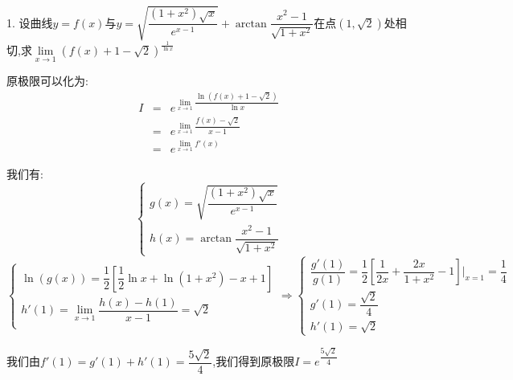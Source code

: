 1. 设曲线$y=f(x)$与$y=\sqrt{\dfrac{(1+x^2)\sqrt{x}}{e^{x-1}}}+\arctan\dfrac{x^2-1}{\sqrt{1+x^2}}$在点$(1,\sqrt{2})$处相切,求$\lim\limits_{x\rightarrow1}(f(x)+1-\sqrt{2})^{\frac{1}{\ln x}}$
\begin{solution}

	原极限可以化为:  
	\begin{eqnarray*}
		I&=&e^{\lim\limits_{x\rightarrow1}\dfrac{\ln(f(x)+1-\sqrt{2})}{\ln x}}\\
		&=&e^{\lim\limits_{x\rightarrow1}\dfrac{f(x)-\sqrt{2}}{x-1}}\\
		&=&e^{\lim\limits_{x\rightarrow1}f'(x)}
	\end{eqnarray*}

	我们有:  $$\left\lbrace
	\begin{array}{l}
		g(x)=\sqrt{\dfrac{(1+x^2)\sqrt{x}}{e^{x-1}}}\\
		h(x)=\arctan\dfrac{x^2-1}{\sqrt{1+x^2}}
	\end{array}
	\right. $$
	$$\left\lbrace
	\begin{array}{l}
		\ln(g(x))=\dfrac{1}{2}[\dfrac{1}{2}\ln x+\ln(1+x^2)-x+1]\\
		h'(1)=\lim\limits_{x\rightarrow 1}\dfrac{h(x)-h(1)}{x-1}=\sqrt{2}\\
	\end{array}
	\right. \Rightarrow \left\lbrace
	\begin{array}{l}
		\dfrac{g'(1)}{g(1)}=\dfrac{1}{2}[\dfrac{1}{2x}+\dfrac{2x}{1+x^2}-1]|_{x=1}=\dfrac{1}{4}\\
		g'(1)=\dfrac{\sqrt{2}}{4}\\
		h'(1)=\sqrt{2}
	\end{array}
	\right. $$
	
	我们由$f'(1)=g'(1)+h'(1)=\dfrac{5\sqrt{2}}{4}$,我们得到原极限$I=e^{\dfrac{5\sqrt{2}}{4}}$
\end{solution}

